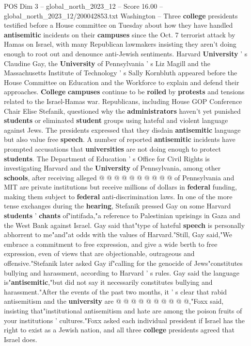\begin{textsample}{POS Dim 3 – global\_north\_2023\_12 – Score 16.00 – global\_north\_2023\_12/200042853.txt}  \label{ex:f3_pos_260}
Washington -- Three \textbf{college} presidents testified before a House committee on Tuesday about how they have handled \textbf{antisemitic} incidents on their \textbf{campuses} since the Oct. 7 terrorist attack by Hamas on Israel, with many Republican lawmakers insisting they aren't doing enough to root out and denounce anti-Jewish sentiments.
Harvard \textbf{University} ' s Claudine Gay, the \textbf{University} of Pennsylvania ' s Liz Magill and the Massachusetts Institute of Technology ' s Sally Kornbluth appeared before the House Committee on Education and the Workforce to explain and defend their approaches. \textbf{College} \textbf{campuses} continue to be \textbf{roiled} by \textbf{protests} and tensions related to the Israel-Hamas war.
Republicans, including House GOP Conference Chair Elise Stefanik, questioned why the \textbf{administrators} haven't yet punished \textbf{students} or eliminated \textbf{student} groups using hateful and violent language against Jews.
The presidents expressed that they disdain \textbf{antisemitic} language but also value free \textbf{speech}.
A number of reported \textbf{antisemitic} incidents have prompted accusations that \textbf{universities} are not doing enough to protect \textbf{students}.
The Department of Education ' s Office for Civil Rights is investigating Harvard and the \textbf{University} of Pennsylvania, among other \textbf{schools}, after receiving alleged @ @ @ @ @ @ @ @ @ @ of Pennsylvania and MIT are private institutions but receive millions of dollars in \textbf{federal} funding, making them subject to \textbf{federal} anti-discrimination laws.
In one of the more tense exchanges during the \textbf{hearing}, Stefanik pressed Gay on some Harvard \textbf{students} ' \textbf{chants} of"intifada,"a reference to Palestinian uprisings in Gaza and the West Bank against Israel.
Gay said that"type of hateful \textbf{speech} is personally abhorrent to me"and"at odds with the values of Harvard."Still, Gay said,"We embrace a commitment to free expression, and give a wide berth to free expression, even of views that are objectionable, outrageous and offensive."Stefanik later asked Gay if"calling for the genocide of Jews"constitutes bullying and harassment, according to Harvard ' s rules.
Gay said the language is"\textbf{antisemitic},"but did not say it necessarily constitutes bullying and harassment."After the events of the past two months, it ' s clear that rabid antisemitism and the \textbf{university} are @ @ @ @ @ @ @ @ @ @,"Foxx said, insisting that"institutional antisemitism and hate are among the poison fruits of your institutions ' cultures."Foxx asked each individual president if Israel has the right to exist as a Jewish nation, and all three \textbf{college} presidents agreed that Israel does.

\end{textsample}
